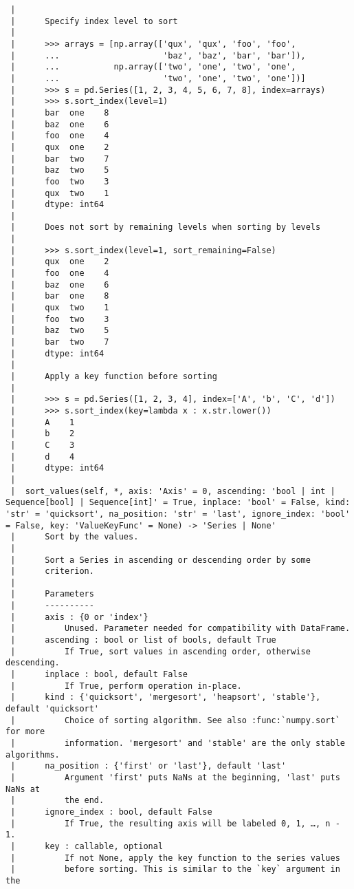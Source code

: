 \documentclass[
  letterpaper,
  DIV=11,
  numbers=noendperiod]{scrreprt}
\begin{document}
\begin{verbatim}
 |      
 |      Specify index level to sort
 |      
 |      >>> arrays = [np.array(['qux', 'qux', 'foo', 'foo',
 |      ...                     'baz', 'baz', 'bar', 'bar']),
 |      ...           np.array(['two', 'one', 'two', 'one',
 |      ...                     'two', 'one', 'two', 'one'])]
 |      >>> s = pd.Series([1, 2, 3, 4, 5, 6, 7, 8], index=arrays)
 |      >>> s.sort_index(level=1)
 |      bar  one    8
 |      baz  one    6
 |      foo  one    4
 |      qux  one    2
 |      bar  two    7
 |      baz  two    5
 |      foo  two    3
 |      qux  two    1
 |      dtype: int64
 |      
 |      Does not sort by remaining levels when sorting by levels
 |      
 |      >>> s.sort_index(level=1, sort_remaining=False)
 |      qux  one    2
 |      foo  one    4
 |      baz  one    6
 |      bar  one    8
 |      qux  two    1
 |      foo  two    3
 |      baz  two    5
 |      bar  two    7
 |      dtype: int64
 |      
 |      Apply a key function before sorting
 |      
 |      >>> s = pd.Series([1, 2, 3, 4], index=['A', 'b', 'C', 'd'])
 |      >>> s.sort_index(key=lambda x : x.str.lower())
 |      A    1
 |      b    2
 |      C    3
 |      d    4
 |      dtype: int64
 |  
 |  sort_values(self, *, axis: 'Axis' = 0, ascending: 'bool | int | Sequence[bool] | Sequence[int]' = True, inplace: 'bool' = False, kind: 'str' = 'quicksort', na_position: 'str' = 'last', ignore_index: 'bool' = False, key: 'ValueKeyFunc' = None) -> 'Series | None'
 |      Sort by the values.
 |      
 |      Sort a Series in ascending or descending order by some
 |      criterion.
 |      
 |      Parameters
 |      ----------
 |      axis : {0 or 'index'}
 |          Unused. Parameter needed for compatibility with DataFrame.
 |      ascending : bool or list of bools, default True
 |          If True, sort values in ascending order, otherwise descending.
 |      inplace : bool, default False
 |          If True, perform operation in-place.
 |      kind : {'quicksort', 'mergesort', 'heapsort', 'stable'}, default 'quicksort'
 |          Choice of sorting algorithm. See also :func:`numpy.sort` for more
 |          information. 'mergesort' and 'stable' are the only stable  algorithms.
 |      na_position : {'first' or 'last'}, default 'last'
 |          Argument 'first' puts NaNs at the beginning, 'last' puts NaNs at
 |          the end.
 |      ignore_index : bool, default False
 |          If True, the resulting axis will be labeled 0, 1, …, n - 1.
 |      key : callable, optional
 |          If not None, apply the key function to the series values
 |          before sorting. This is similar to the `key` argument in the

\end{verbatim}
\end{document}
